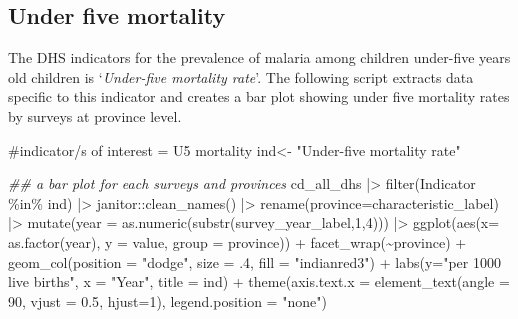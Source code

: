 \documentclass[
  letterpaper,
  DIV=11,
  numbers=noendperiod]{scrreprt}
\newenvironment{Shaded}{\begin{snugshade}}{\end{snugshade}}
\newcommand{\AttributeTok}[1]{\textcolor[rgb]{0.40,0.45,0.13}{#1}}
\newcommand{\CommentTok}[1]{\textcolor[rgb]{0.37,0.37,0.37}{#1}}
\newcommand{\DecValTok}[1]{\textcolor[rgb]{0.68,0.00,0.00}{#1}}
\newcommand{\DocumentationTok}[1]{\textcolor[rgb]{0.37,0.37,0.37}{\textit{#1}}}
\newcommand{\FloatTok}[1]{\textcolor[rgb]{0.68,0.00,0.00}{#1}}
\newcommand{\FunctionTok}[1]{\textcolor[rgb]{0.28,0.35,0.67}{#1}}
\newcommand{\NormalTok}[1]{\textcolor[rgb]{0.00,0.23,0.31}{#1}}
\newcommand{\OtherTok}[1]{\textcolor[rgb]{0.00,0.23,0.31}{#1}}
\newcommand{\SpecialCharTok}[1]{\textcolor[rgb]{0.37,0.37,0.37}{#1}}
\newcommand{\StringTok}[1]{\textcolor[rgb]{0.13,0.47,0.30}{#1}}
\begin{document}
\subsection{Under five mortality}\label{under-five-mortality}

The DHS indicators for the prevalence of malaria among children
under-five years old children is `\emph{Under-five mortality rate}'. The
following script extracts data specific to this indicator and creates a
bar plot showing under five mortality rates by surveys at province
level.

\begin{Shaded}
\begin{Highlighting}[]
\CommentTok{\#indicator/s of interest = U5 mortality }
\NormalTok{ind}\OtherTok{\textless{}{-}} \StringTok{"Under{-}five mortality rate"}     

\DocumentationTok{\#\# a bar plot for each surveys and provinces }
\NormalTok{  cd\_all\_dhs }\SpecialCharTok{|\textgreater{}}   
  \FunctionTok{filter}\NormalTok{(Indicator }\SpecialCharTok{\%in\%}\NormalTok{ ind) }\SpecialCharTok{|\textgreater{}}
\NormalTok{    janitor}\SpecialCharTok{::}\FunctionTok{clean\_names}\NormalTok{() }\SpecialCharTok{|\textgreater{}}  
    \FunctionTok{rename}\NormalTok{(}\AttributeTok{province=}\NormalTok{characteristic\_label) }\SpecialCharTok{|\textgreater{}}
    \FunctionTok{mutate}\NormalTok{(}\AttributeTok{year =} \FunctionTok{as.numeric}\NormalTok{(}\FunctionTok{substr}\NormalTok{(survey\_year\_label,}\DecValTok{1}\NormalTok{,}\DecValTok{4}\NormalTok{))) }\SpecialCharTok{|\textgreater{}}
    \FunctionTok{ggplot}\NormalTok{(}\FunctionTok{aes}\NormalTok{(}\AttributeTok{x=} \FunctionTok{as.factor}\NormalTok{(year), }\AttributeTok{y =}\NormalTok{ value, }\AttributeTok{group =}\NormalTok{ province)) }\SpecialCharTok{+}
    \FunctionTok{facet\_wrap}\NormalTok{(}\SpecialCharTok{\textasciitilde{}}\NormalTok{province) }\SpecialCharTok{+}
    \FunctionTok{geom\_col}\NormalTok{(}\AttributeTok{position =} \StringTok{"dodge"}\NormalTok{, }\AttributeTok{size =}\NormalTok{ .}\DecValTok{4}\NormalTok{, }\AttributeTok{fill =} \StringTok{"indianred3"}\NormalTok{) }\SpecialCharTok{+}
    \FunctionTok{labs}\NormalTok{(}\AttributeTok{y=}\StringTok{"per 1000 live births"}\NormalTok{, }\AttributeTok{x =} \StringTok{"Year"}\NormalTok{,}
       \AttributeTok{title =}\NormalTok{ ind) }\SpecialCharTok{+}
    \FunctionTok{theme}\NormalTok{(}\AttributeTok{axis.text.x =} \FunctionTok{element\_text}\NormalTok{(}\AttributeTok{angle =} \DecValTok{90}\NormalTok{, }\AttributeTok{vjust =} \FloatTok{0.5}\NormalTok{, }\AttributeTok{hjust=}\DecValTok{1}\NormalTok{),}
          \AttributeTok{legend.position =} \StringTok{"none"}\NormalTok{)}
\end{Highlighting}
\end{Shaded}
\end{document}
